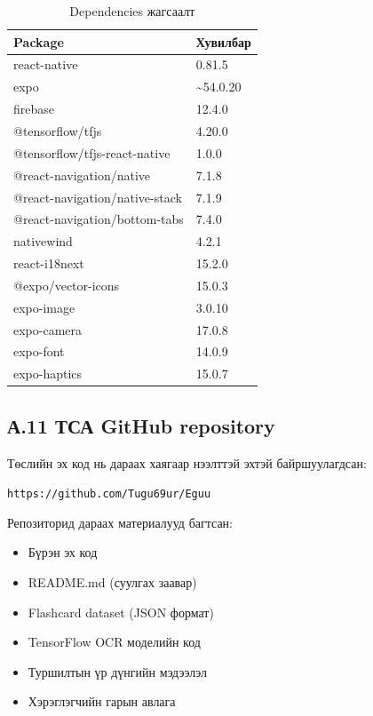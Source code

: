 \begin{table}[H]
\centering
\caption{Dependencies жагсаалт}
\begin{tabular}{|l|l|}
\hline
\textbf{Package} & \textbf{Хувилбар} \\
\hline
react-native & 0.81.5 \\
\hline
expo & \textasciitilde54.0.20 \\
\hline
firebase & 12.4.0 \\
\hline
@tensorflow/tfjs & 4.20.0 \\
\hline
@tensorflow/tfjs-react-native & 1.0.0 \\
\hline
@react-navigation/native & 7.1.8 \\
\hline
@react-navigation/native-stack & 7.1.9 \\
\hline
@react-navigation/bottom-tabs & 7.4.0 \\
\hline
nativewind & 4.2.1 \\
\hline
react-i18next & 15.2.0 \\
\hline
@expo/vector-icons & 15.0.3 \\
\hline
expo-image & 3.0.10 \\
\hline
expo-camera & 17.0.8 \\
\hline
expo-font & 14.0.9 \\
\hline
expo-haptics & 15.0.7 \\
\hline
\end{tabular}
\end{table}

\subsection*{А.11 ТСА GitHub repository}

Төслийн эх код нь дараах хаягаар нээлттэй эхтэй байршуулагдсан:

\texttt{https://github.com/Tugu69ur/Eguu}

Репозиторид дараах материалууд багтсан:
\begin{itemize}
    \item Бүрэн эх код
    \item README.md (суулгах заавар)
    \item Flashcard dataset (JSON формат)
    \item TensorFlow OCR моделийн код
    \item Туршилтын үр дүнгийн мэдээлэл
    \item Хэрэглэгчийн гарын авлага
\end{itemize}

\vfill
